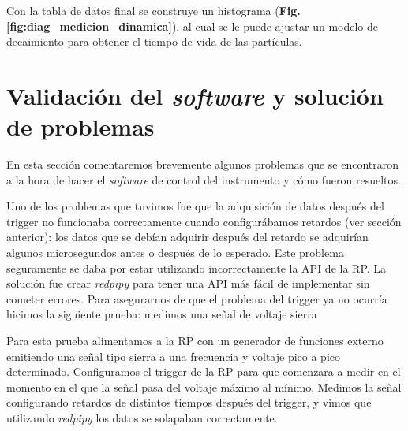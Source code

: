 Con la tabla de datos final se construye un histograma (\textbf{Fig. \ref{fig:diag_medicion_dinamica}}), al cual se le puede ajustar un modelo de decaimiento para obtener el tiempo de vida de las partículas.


\section{Validación del \textit{software} y solución de problemas}

En esta sección comentaremos brevemente algunos problemas que se encontraron a la hora de hacer el \textit{software} de control del instrumento y cómo fueron resueltos.

Uno de los problemas que tuvimos fue que la adquisición de datos después del trigger no funcionaba correctamente cuando configurábamos retardos (ver sección anterior): los datos que se debían adquirir después del retardo se adquirían algunos microsegundos antes o después de lo esperado.
Este problema seguramente se daba por estar utilizando incorrectamente la API de la RP.
La solución fue crear \textit{redpipy} para tener una API más fácil de implementar sin cometer errores.
Para asegurarnos de que el problema del trigger ya no ocurría hicimos la siguiente prueba: medimos una señal de voltaje sierra 

Para esta prueba alimentamos a la RP con un generador de funciones externo emitiendo una señal tipo sierra a una frecuencia y voltaje pico a pico determinado.
Configuramos el trigger de la RP para que comenzara a medir en el momento en el que la señal pasa del voltaje máximo al mínimo.
Medimos la señal configurando retardos de distintos tiempos después del trigger, y vimos que utilizando \textit{redpipy} los datos se solapaban correctamente.


